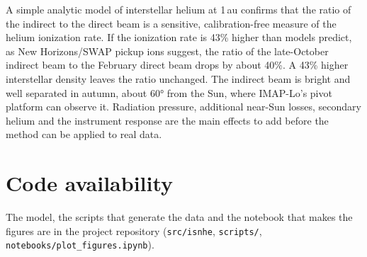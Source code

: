 \documentclass[10pt,a4paper,twocolumn]{article}
\begin{document}
A simple analytic model of interstellar helium at 1\,au confirms that the
ratio of the indirect to the direct beam is a sensitive, calibration-free
measure of the helium ionization rate. If the ionization rate is 43\% higher
than models predict, as New Horizons/SWAP pickup ions suggest, the ratio of
the late-October indirect beam to the February direct beam drops by about
40\%. A 43\% higher interstellar density leaves the ratio unchanged. The
indirect beam is bright and well separated in autumn, about \ang{60} from the
Sun, where IMAP-Lo's pivot platform can observe it. Radiation pressure,
additional near-Sun losses, secondary helium and the instrument response are
the main effects to add before the method can be applied to real data.

\section*{Code availability}

The model, the scripts that generate the data and the notebook that makes the
figures are in the project repository (\texttt{src/isnhe},
\texttt{scripts/}, \texttt{notebooks/plot\_figures.ipynb}).
\end{document}

